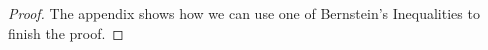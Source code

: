 \documentclass[kpfonts]{patmorin}
\newcommand{\defin}[1]{\emph{\color{brightmaroon}#1}}
\DeclareMathOperator{\outn}{out}
\DeclareMathOperator{\comp}{comp}
\begin{document}
\begin{proof}
  The appendix shows how we can use one of Bernstein's Inequalities to finish the proof.

\end{proof}
\end{document}
